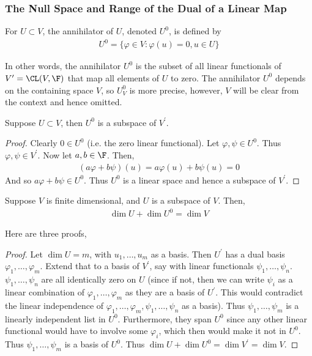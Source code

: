 \documentclass{article}
\begin{document}
\subsubsection{The Null Space and Range of the Dual of a Linear Map}
  \begin{defn}[Annihilator, $U^0$]
    For $U \subset V$, the annihilator of $U$, denoted $U^0$, is defined by
    \begin{align*}
      U^0 = \{\varphi \in V: \varphi(u) = 0, u \in U\}
    \end{align*}
  \end{defn}
  In other words, the annihilator $U^0$ is the subset of all linear functionals of $V^\prime = \CL(V, \F)$ that map all elements of $U$ to zero. The annihilator $U^0$ depends on the
  containing space $V$, so $U^0_V$ is more precise, however, $V$ will be clear from the context and hence omitted.
  \begin{prop}
    Suppose $U \subset V$, then $U^0$ is a subspace of $V^\prime$.
  \end{prop}
  \begin{proof}
    Clearly $0 \in U^0$ (i.e. the zero linear functional). Let $\varphi, \psi \in U^0$. Thus $\varphi, \psi \in V^{\prime}$. Now let $a, b \in \F$. Then,
    \begin{align*}
      (a\varphi + b\psi)(u) = a\varphi(u) + b\psi(u) = 0
    \end{align*}
    And so $a\varphi + b\psi \in U^0$. Thus $U^0$ is a linear space and hence a subspace of $V^\prime$.
  \end{proof}
  \begin{prop}\label{prop:dim_annihilator}
    Suppose $V$ is finite dimensional, and $U$ is a subspace of $V$. Then,
    \begin{align*}
      \dim U + \dim U^0 = \dim V
    \end{align*}
  \end{prop}
  Here are three proofs,
  \begin{proof}
    Let $\dim U = m$, with $u_1, \dots, u_m$ as a basis. Then $U^\prime$ has a dual basis $\varphi_1, \dots, \varphi_m$. Extend that to a basis of $V^\prime$, say with linear functionals
    $\psi_1, \dots, \psi_n$. $\psi_1, \dots, \psi_n$ are all identically zero on $U$ (since if not, then we can write $\psi_i$ as a linear combination of $\varphi_1, \dots, \varphi_m$ as
    they are a basis of $U^\prime$. This would contradict the linear independence of $\varphi_1, \dots, \varphi_m, \psi_1, \dots, \psi_n$ as a basis). Thus $\psi_1, \dots, \psi_m$ is a
    linearly independent list in $U^0$. Furthermore, they span $U^0$ since any other linear functional would have to involve some $\varphi_i$, which then would make it not in $U^0$. Thus
    $\psi_1, \dots, \psi_m$ is a basis of $U^0$. Thus $\dim U + \dim U^0 = \dim V^\prime = \dim V$.
  \end{proof}
\end{document}
